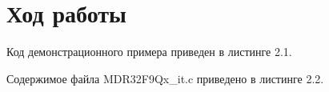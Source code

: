 \documentclass[14pt,a4paper,report]{report}
\begin{document}
\section {Ход работы}

Код демонстрационного примера приведен в листинге 2.1.


\vspace*{1.5em plus .6em minus .5em}
Содержимое файла MDR32F9Qx\_it.c приведено в листинге 2.2.

\end{document}
